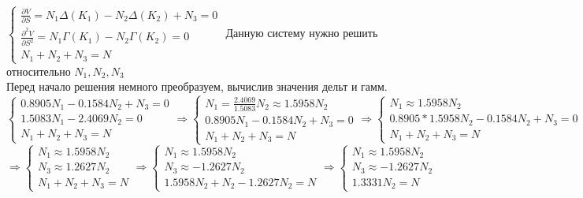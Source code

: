 \documentclass[a4paper]{article}
\theoremstyle{definition}
\begin{document}
    $
    \begin{cases}
        \frac{\partial V}{\partial S} = N_1 \Delta(K_1) - N_2 \Delta(K_2) + N_3 = 0 \\
        \frac{\partial^2 V}{\partial S^2} = N_1 \Gamma(K_1) - N_2 \Gamma(K_2) = 0 \\
        N_1 + N_2 + N_3 = N
    \end{cases}
    $ Данную систему нужно решить относительно $N_1, N_2, N_3$ \\
    Перед начало решения немного преобразуем, вычислив значения дельт и гамм. \\
    $
    \begin{cases}
        0.8905 N_1 - 0.1584N_2 + N_3 = 0 \\
        1.5083N_1 - 2.4069N_2 = 0 \\
        N_1 + N_2 + N_3 = N
    \end{cases} 
    \Rightarrow
    \begin{cases}
        N_1 = \frac{2.4069}{1.5083}N_2 \approx 1.5958N_2 \\
        0.8905 N_1 - 0.1584N_2 + N_3 = 0 \\
        N_1 + N_2 + N_3 = N
    \end{cases}
    \Rightarrow
    \begin{cases}
        N_1 \approx 1.5958N_2 \\
        0.8905 * 1.5958N_2 - 0.1584N_2 + N_3 = 0 \\
        N_1 + N_2 + N_3 = N
    \end{cases}
    $ \\

    $
    \Rightarrow
    \begin{cases}
        N_1 \approx 1.5958N_2 \\
        N_3 \approx 1.2627N_2 \\
        N_1 + N_2 + N_3 = N
    \end{cases}
    \Rightarrow
        \begin{cases}
        N_1 \approx 1.5958N_2 \\
        N_3 \approx -1.2627N_2 \\
        1.5958N_2 + N_2 -1.2627N_2 = N
    \end{cases}
    \Rightarrow
    \begin{cases}
        N_1 \approx 1.5958N_2 \\
        N_3 \approx -1.2627N_2 \\
        1.3331N_2 = N
    \end{cases}
    $ \\
\end{document}
